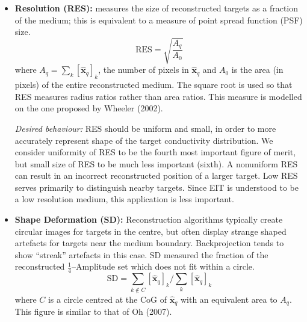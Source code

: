 \documentclass[12pt]{iopart}
\newcommand{\xH}{\mbox{$\mathbf{\hat x}$}}
\begin{document}
\begin{itemize}
\hspace{5mm}
{\em Desired behaviour:}
PE should be small and show small variability for
targets at different radial positions. We consider
small and constant PE to be the second most important
figure of merit. If PE is variable, interpretation
of a distribution of air in the lungs becomes unreliable.
Sheffield backprojection has large PE near the
electrodes; this has resulted in cases where changes at
the electrodes are misinterpreted as being inside the body.

\item
{\bf Resolution (RES):}
measures the size of reconstructed targets as a fraction
of the medium; this is
equivalent to a measure of point spread function (PSF) size.
\begin{equation}
\mathrm{RES} = \sqrt{
 \frac{ A_q }
      { A_0 }
 }
\end{equation}
where $A_q =  \sum_k [\xH_q]_k$, the number
of pixels in $\xH_q$ and 
$A_0$ is the area (in pixels) of
the entire reconstructed medium. The square root is used 
so that RES measures radius ratios rather than area ratios.
This measure is modelled on the one proposed by
Wheeler \etal (2002).

\hspace{5mm}
{\em Desired behaviour:}
RES should be uniform and small, in order to 
more accurately represent shape of the target conductivity
distribution. We consider uniformity of RES to be the
fourth most important figure of merit, but small size
of RES to be much less important (sixth). A nonuniform
RES can result in an incorrect reconstructed 
position of a larger target. Low RES serves primarily
to distinguish nearby targets. Since EIT is understood to
be a low resolution medium, this application is less important.

\item
{\bf Shape Deformation (SD):}
Reconstruction algorithms typically create circular
images for targets in the centre, but often display 
strange shaped artefacts for targets near the medium
boundary. Backprojection tends to show ``streak''
artefacts in this case.
SD measured the fraction of the reconstructed
$\frac{1}{4}$--Amplitude set which does not
fit within a circle.
\begin{equation}
\mathrm{SD} = \sum_{k\not\in C} [\xH_q]_k / 
              \sum_{k} [\xH_q]_k
\end{equation}
where $C$ is a circle centred at the CoG of $\xH_q$
with an equivalent area to $A_q$. This figure
is similar to that of Oh \etal (2007).


\end{itemize}
\end{document}
